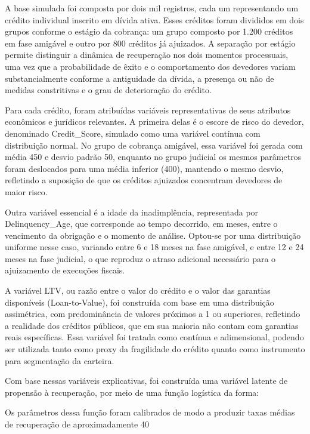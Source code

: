 \documentclass[a4paper,12pt]{article}
\begin{document}
A base simulada foi composta por dois mil registros, cada um representando um crédito individual inscrito em dívida ativa. Esses créditos foram divididos em dois grupos conforme o estágio da cobrança: um grupo composto por 1.200 créditos em fase amigável e outro por 800 créditos já ajuizados. A separação por estágio permite distinguir a dinâmica de recuperação nos dois momentos processuais, uma vez que a probabilidade de êxito e o comportamento dos devedores variam substancialmente conforme a antiguidade da dívida, a presença ou não de medidas constritivas e o grau de deterioração do crédito.

Para cada crédito, foram atribuídas variáveis representativas de seus atributos econômicos e jurídicos relevantes. A primeira delas é o escore de risco do devedor, denominado Credit_Score, simulado como uma variável contínua com distribuição normal. No grupo de cobrança amigável, essa variável foi gerada com média 450 e desvio padrão 50, enquanto no grupo judicial os mesmos parâmetros foram deslocados para uma média inferior (400), mantendo o mesmo desvio, refletindo a suposição de que os créditos ajuizados concentram devedores de maior risco.

Outra variável essencial é a idade da inadimplência, representada por Delinquency_Age, que corresponde ao tempo decorrido, em meses, entre o vencimento da obrigação e o momento de análise. Optou-se por uma distribuição uniforme nesse caso, variando entre 6 e 18 meses na fase amigável, e entre 12 e 24 meses na fase judicial, o que reproduz o atraso adicional necessário para o ajuizamento de execuções fiscais.

A variável LTV, ou razão entre o valor do crédito e o valor das garantias disponíveis (Loan-to-Value), foi construída com base em uma distribuição assimétrica, com predominância de valores próximos a 1 ou superiores, refletindo a realidade dos créditos públicos, que em sua maioria não contam com garantias reais específicas. Essa variável foi tratada como contínua e adimensional, podendo ser utilizada tanto como proxy da fragilidade do crédito quanto como instrumento para segmentação da carteira.

Com base nessas variáveis explicativas, foi construída uma variável latente de propensão à recuperação, por meio de uma função logística da forma:


 
Os parâmetros dessa função foram calibrados de modo a produzir taxas médias de recuperação de aproximadamente 40%
\end{document}
